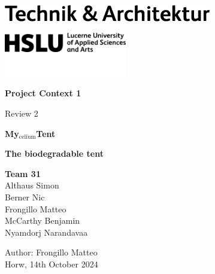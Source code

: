 \documentclass{article}
\begin{document}
\begin{titlepage}
    \begin{flushleft}
        \hspace*{.01cm}
        \includegraphics[width=.3\textwidth]{media/hslu-logo-2.png}

        \vspace*{.01cm}
        \hspace*{.16cm}\includegraphics[width=0.4\textwidth]{media/hslu-svg-logo.png}
    \end{flushleft}

    \vspace*{-.4cm}
    {\huge \textbf{Project Context 1}}

    {\Large Review 2}

    \vspace*{3cm}
    \begin{center}
        {\Huge \textbf{My$_{\text{celium}}$Tent}}

        \vspace*{.1cm}
        \textbf{\large The biodegradable tent}

    \end{center}

    \vfill
    {\Large \textbf{Team 31}}\\
    {\large \vspace*{.01cm}
        Althaus Simon\\
        \vspace*{.01cm}
        Berner Nic\\
        \vspace*{.01cm}   
        Frongillo Matteo\\
        \vspace*{.01cm}
        McCarthy Benjamin\\
        \vspace*{.01cm}
        Nyamdorj Narandavaa\\
        \vspace*{.01cm}
    }
    
    \vspace{.75cm}
    {\large
    Author: Frongillo Matteo\\
    Horw, 14th October 2024
    }
\end{titlepage}
\end{document}
